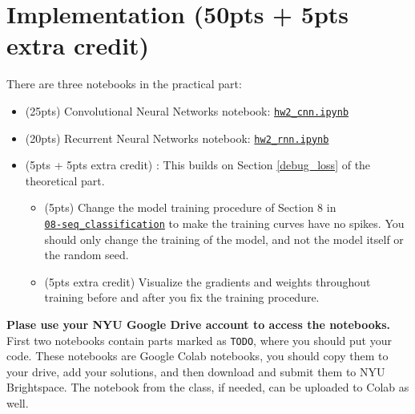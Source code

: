 \section{Implementation (50pts + 5pts extra credit)}



There are three notebooks in the practical part:
\begin{itemize}
    \item (25pts) Convolutional Neural Networks notebook:
    \href{https://drive.google.com/file/d/1ldhJS40UdIaXxdwfMdax6GtwAf8Srtwh/view?usp=sharing}{\texttt{hw2\_cnn.ipynb}}
    \item (20pts) Recurrent Neural Networks notebook:
    \href{https://drive.google.com/file/d/1DwNkLMIlz4YUk_ujai3tuUdD1N6-b7uX/view?usp=sharing}{\texttt{hw2\_rnn.ipynb}}
    \item (5pts + 5pts extra credit) :
        This builds on Section \ref{debug_loss} of the theoretical part.
        \begin{itemize}
            \item (5pts) Change the model training procedure of Section 8 in \\ \href{https://github.com/Atcold/pytorch-Deep-Learning/blob/master/08-seq_classification.ipynb}{\texttt{08-seq\_classification}} to make the training curves have no spikes. You should only change the training of the model, and not the model itself or the random seed.
            \item (5pts extra credit) Visualize the gradients and weights throughout training before and after you fix the training procedure.
        \end{itemize}
\end{itemize}

\textbf{Plase use your NYU Google Drive account to access the notebooks.} First two notebooks contain parts marked as \texttt{TODO}, where you should put your code. These notebooks are Google Colab notebooks, you should copy them to your drive, add your solutions, and then download and submit them to NYU Brightspace. The notebook from the class, if needed, can be uploaded to  Colab as well.
